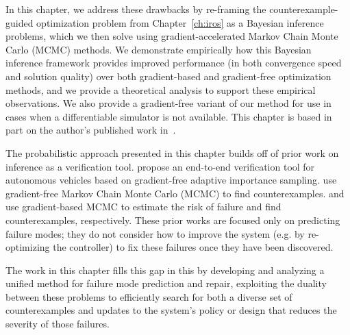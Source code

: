 In this chapter, we address these drawbacks by re-framing the counterexample-guided optimization problem from Chapter~\ref{ch:iros} as a Bayesian inference problems, which we then solve using gradient-accelerated Markov Chain Monte Carlo (MCMC) methods. We demonstrate empirically how this Bayesian inference framework provides improved performance (in both convergence speed and solution quality) over both gradient-based and gradient-free optimization methods, and we provide a theoretical analysis to support these empirical observations. We also provide a gradient-free variant of our method for use in cases when a differentiable simulator is not available. This chapter is based in part on the author's published work in~\cite{dawsonBayesianApproachBreaking2023}.

The probabilistic approach presented in this chapter builds off of prior work on inference as a verification tool. \cite{okellyScalableEndtoEndAutonomous2018} propose an end-to-end verification tool for autonomous vehicles based on gradient-free adaptive importance sampling. \cite{zhouRoCUSRobotController2021} use gradient-free Markov Chain Monte Carlo (MCMC) to find counterexamples. \cite{sinhaNeuralBridgeSampling2020} and \cite{deleckiModelbasedValidationProbabilistic2023a} use gradient-based MCMC to estimate the risk of failure and find counterexamples, respectively.
%
These prior works are focused only on predicting failure modes; they do not consider how to improve the system (e.g. by re-optimizing the controller) to fix these failures once they have been discovered. 

The work in this chapter fills this gap in this by developing and analyzing a unified method for failure mode prediction and repair, exploiting the duality between these problems to efficiently search for both a diverse set of counterexamples and updates to the system's policy or design that reduces the severity of those failures.


